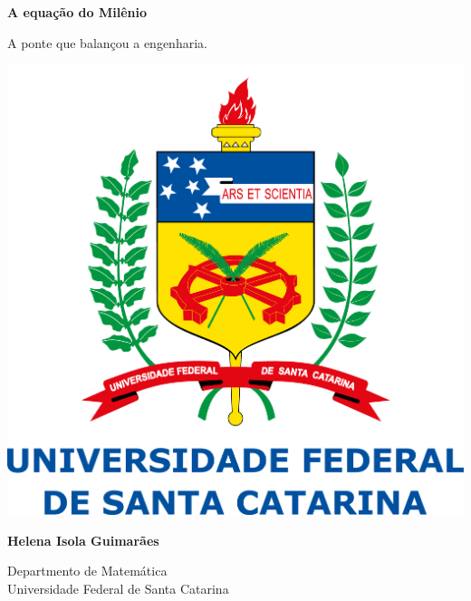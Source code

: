 \documentclass[]{article}
\begin{document}
\begin{titlepage}
    \begin{center}
        \vspace*{1cm}
        \huge
        \textbf{A equação do Milênio} %
        
        \large
        \vspace{0.5cm}
         A ponte que balançou a engenharia.
             
        \vspace{0.5cm}

        \includegraphics[width=1\textwidth]{logoUfsc.png}

        \vspace{0.8cm}
        \textbf{Helena Isola Guimarães}
        \vspace{0.8cm}
             
        Departmento de Matemática\\
        Universidade Federal de Santa Catarina\\
             
    \end{center}
\end{titlepage}
\end{document}
